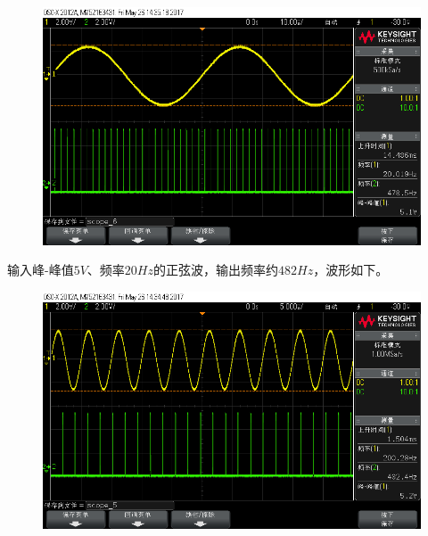 \documentclass[12pt,a4paper]{article}
\begin{document}
\begin{spacing}{1.3}
\begin{figure}[H]
\includegraphics[width=\textwidth]{scope_6.png}
\end{figure}
输入峰-峰值$5V、频率20Hz的正弦波，输出频率约482Hz$，波形如下。
\begin{figure}[H]
\centering
\includegraphics[width=\textwidth]{scope_5.png}
\end{figure}

\end{spacing}
\end{document}
